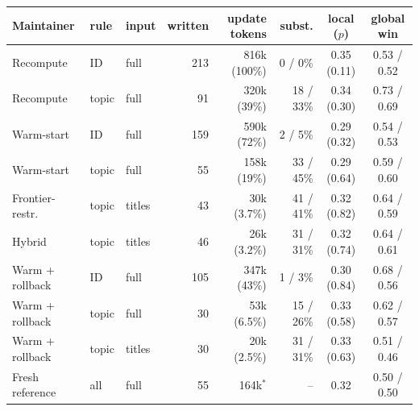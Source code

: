 \begin{tabular}{l l l r r r c c}
\toprule
Maintainer & rule & input & written & update tokens & subst. & local ($p$) & global win\\
\midrule
Recompute & ID & full & 213 & 816k (100\%) & 0 / 0\% & 0.35 (0.11) & 0.53 / 0.52 \\
Recompute & topic & full & 91 & 320k (39\%) & 18 / 33\% & 0.34 (0.30) & 0.73 / 0.69 \\
Warm-start & ID & full & 159 & 590k (72\%) & 2 / 5\% & 0.29 (0.32) & 0.54 / 0.53 \\
Warm-start & topic & full & 55 & 158k (19\%) & 33 / 45\% & 0.29 (0.64) & 0.59 / 0.60 \\
Frontier-restr. & topic & titles & 43 & 30k (3.7\%) & 41 / 41\% & 0.32 (0.82) & 0.64 / 0.59 \\
Hybrid & topic & titles & 46 & 26k (3.2\%) & 31 / 31\% & 0.32 (0.74) & 0.64 / 0.61 \\
Warm + rollback & ID & full & 105 & 347k (43\%) & 1 / 3\% & 0.30 (0.84) & 0.68 / 0.56 \\
Warm + rollback & topic & full & 30 & 53k (6.5\%) & 15 / 26\% & 0.33 (0.58) & 0.62 / 0.57 \\
Warm + rollback & topic & titles & 30 & 20k (2.5\%) & 31 / 31\% & 0.33 (0.63) & 0.51 / 0.46 \\
\midrule
Fresh reference & all & full & 55 & 164k$^{*}$ & -- & 0.32 & 0.50 / 0.50 \\
\bottomrule
\end{tabular}
